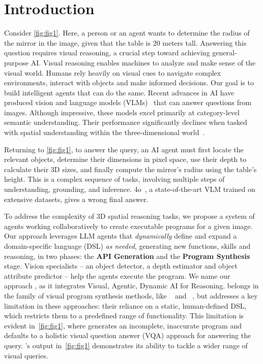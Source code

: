 \section{Introduction}
\label{sec:intro}
Consider \cref{fig:fig1}. 
Here, a person or an agent wants to determine the radius of the mirror in the image, given that the table is 20 meters tall. 
Answering this question requires visual reasoning, a crucial step toward achieving general-purpose AI.
Visual reasoning enables machines to analyze and make sense of the visual world. 
Humans rely heavily on visual cues to navigate complex environments, interact with objects and make informed decisions.
Our goal is to build intelligent agents that can do the same.
Recent advances in AI have produced vision and language models (VLMs)~\cite{gpt4, claude, molmo, gemini} that can answer questions from images. 
Although impressive, these models excel primarily at category-level semantic understanding. 
Their performance significantly declines when tasked with spatial understanding within the three-dimensional world~\cite{spatial, cambrian1, whatsup}. 

Returning to \cref{fig:fig1}, to answer the query, an AI agent must first locate the relevant objects,  determine their dimensions in pixel space, use their depth to calculate their 3D sizes, and finally compute the mirror's radius using the table's height.
This is a complex sequence of tasks, involving multiple steps of understanding, grounding, and inference. 
\gpt4o~\cite{gpt4}, a state-of-the-art VLM trained on extensive datasets, gives a wrong final answer.

To address the complexity of 3D spatial reasoning tasks, we propose a system of agents working collaboratively to create executable programs for a given image. 
Our approach leverages LLM agents that \emph{dynamically} define and expand a domain-specific language (DSL) \emph{as needed}, generating new functions, skills and reasoning, in two phases: the \textbf{API Generation} and the \textbf{Program Synthesis} stage.
Vision specialists -- an object detector, a depth estimator and object attribute predictor -- help the agents execute the program.
We name our approach \method, as it integrates Visual, Agentic, Dynamic AI for Reasoning.
\method belongs in the family of visual program synthesis methods, like \viper~\cite{vipergpt} and \visprog~\cite{visprog}, but addresses a key limitation in these approaches: their reliance on a static, human-defined DSL, which restricts them to a predefined range of functionality.
This limitation is evident in~\cref{fig:fig1}, where \viper generates an incomplete, inaccurate program and \visprog defaults to a holistic visual question answer (VQA) approach for answering the query.
\method's output in~\cref{fig:fig1} demonstrates its ability to tackle a wider range of visual queries.

